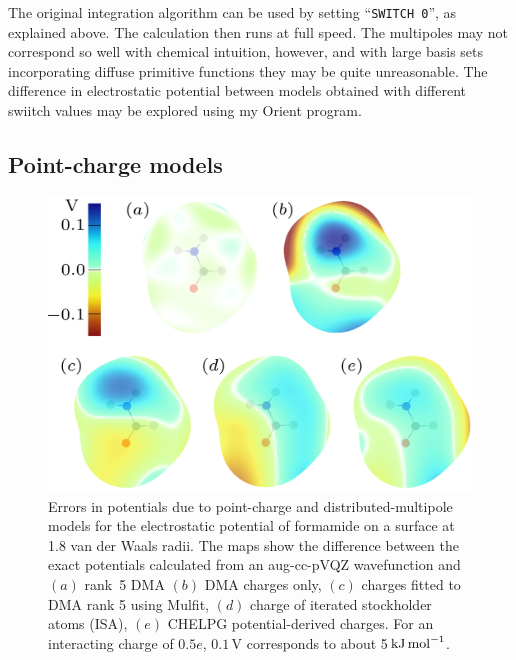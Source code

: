 \documentclass[12pt,txfonts]{paper}
\newcommand\kJpermol{\ensuremath{\,{\rm kJ\,mol}^{-1}}}
\begin{document}
The original integration algorithm can be used by setting
``\verb+SWITCH 0+'', as explained above. The calculation then runs at
full speed. The multipoles may not correspond so well with chemical
intuition, however, and with large basis sets incorporating diffuse
primitive functions they may be quite unreasonable. The difference in
electrostatic potential between models obtained with different swiitch
values may be explored using my Orient program.


\subsection{Point-charge models}
\label{subsec:ptcharge}

\begin{figure}[tb]
\begin{center}
\includegraphics[scale=0.5,viewport=200 0 600 500]{pictures/point-charge-models.pdf}
\end{center}
\caption{Errors in potentials due to point-charge and
  distributed-multipole models for the 
electrostatic potential of formamide on a surface at 1.8 van der Waals
radii. The maps show the difference between the exact potentials
calculated from an aug-cc-pVQZ wavefunction and $(a)$ rank~5 DMA $(b)$
DMA charges only, $(c)$ charges fitted to DMA rank 5 using {\sc
  Mulfit}, $(d)$ charge of iterated stockholder atoms (ISA), $(e)$
CHELPG potential-derived charges. For an interacting charge of $0.5e$,
$0.1\,$V corresponds to about 5\kJpermol.}
\label{fig:formamide}
\end{figure}
\end{document}
